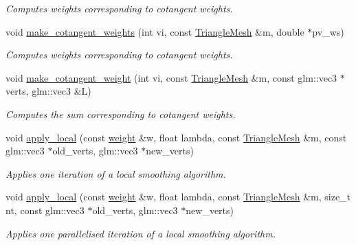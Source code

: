 \begin{DoxyCompactItemize}
\begin{DoxyCompactList}\small\item\em Computes weights corresponding to cotangent weights. \end{DoxyCompactList}\item 
void \hyperlink{namespacegeoproc_1_1smoothing_1_1local__private_a258b6f254a89ea6773e6b59cbe16e4f5}{make\+\_\+cotangent\+\_\+weights} (int vi, const \hyperlink{classgeoproc_1_1TriangleMesh}{Triangle\+Mesh} \&m, double $\ast$pv\+\_\+ws)
\begin{DoxyCompactList}\small\item\em Computes weights corresponding to cotangent weights. \end{DoxyCompactList}\item 
void \hyperlink{namespacegeoproc_1_1smoothing_1_1local__private_ae75c9986480b1c0cd2c5ac84e0fe8d34}{make\+\_\+cotangent\+\_\+weight} (int vi, const \hyperlink{classgeoproc_1_1TriangleMesh}{Triangle\+Mesh} \&m, const glm\+::vec3 $\ast$verts, glm\+::vec3 \&L)
\begin{DoxyCompactList}\small\item\em Computes the sum corresponding to cotangent weights. \end{DoxyCompactList}\item 
void \hyperlink{namespacegeoproc_1_1smoothing_1_1local__private_a233a9fc9782e2064cbd1c7006485a865}{apply\+\_\+local} (const \hyperlink{namespacegeoproc_a12e5a10581b53b9dd9a509127527f843}{weight} \&w, float lambda, const \hyperlink{classgeoproc_1_1TriangleMesh}{Triangle\+Mesh} \&m, const glm\+::vec3 $\ast$old\+\_\+verts, glm\+::vec3 $\ast$new\+\_\+verts)
\begin{DoxyCompactList}\small\item\em Applies one iteration of a local smoothing algorithm. \end{DoxyCompactList}\item 
void \hyperlink{namespacegeoproc_1_1smoothing_1_1local__private_a20ed9aea1e6c471bdec5608e19bb73bd}{apply\+\_\+local} (const \hyperlink{namespacegeoproc_a12e5a10581b53b9dd9a509127527f843}{weight} \&w, float lambda, const \hyperlink{classgeoproc_1_1TriangleMesh}{Triangle\+Mesh} \&m, size\+\_\+t nt, const glm\+::vec3 $\ast$old\+\_\+verts, glm\+::vec3 $\ast$new\+\_\+verts)
\begin{DoxyCompactList}\small\item\em Applies one parallelised iteration of a local smoothing algorithm. \end{DoxyCompactList}\item 

\end{DoxyCompactItemize}
